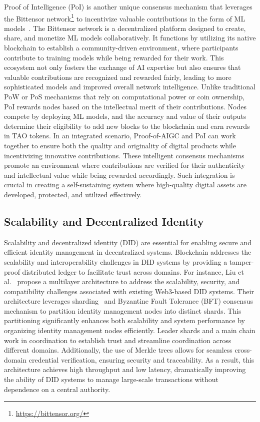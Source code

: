 \documentclass[5p,twocolumn]{elsarticle}
\begin{document}
Proof of Intelligence (PoI) is another unique consensus mechanism that leverages the Bittensor network\footnote{\url{https://bittensor.org/}} to incentivize valuable contributions in the form of ML models~\cite{rao2020bittensor}. The Bittensor network is a decentralized platform designed to create, share, and monetize ML models collaboratively. It functions by utilizing its native blockchain to establish a community-driven environment, where participants contribute to training models while being rewarded for their work. This ecosystem not only fosters the exchange of AI expertise but also ensures that valuable contributions are recognized and rewarded fairly, leading to more sophisticated models and improved overall network intelligence. Unlike traditional PoW or PoS mechanisms that rely on computational power or coin ownership, PoI rewards nodes based on the intellectual merit of their contributions. Nodes compete by deploying ML models, and the accuracy and value of their outputs determine their eligibility to add new blocks to the blockchain and earn rewards in TAO tokens. In an integrated scenario, Proof-of-AIGC and PoI can work together to ensure both the quality and originality of digital products while incentivizing innovative contributions. These intelligent consensus mechanisms promote an environment where contributions are verified for their authenticity and intellectual value while being rewarded accordingly. Such integration is crucial in creating a self-sustaining system where high-quality digital assets are developed, protected, and utilized effectively.


\subsection{Scalability and Decentralized Identity}
Scalability and decentralized identity (DID) are essential for enabling secure and efficient identity management in decentralized systems. Blockchain addresses the scalability and interoperability challenges in DID systems by providing a tamper-proof distributed ledger to facilitate trust across domains. For instance, Liu et al.~\cite{liu2024ssdid} propose a multilayer architecture to address the scalability, security, and compatibility challenges associated with existing Web3-based DID systems. Their architecture leverages sharding~\cite{thong2025know} and Byzantine Fault Tolerance (BFT) consensus mechanism to partition identity management nodes into distinct shards. This partitioning significantly enhances both scalability and system performance by organizing identity management nodes efficiently. Leader shards and a main chain work in coordination to establish trust and streamline coordination across different domains. Additionally, the use of Merkle trees allows for seamless cross-domain credential verification, ensuring security and traceability. As a result, this architecture achieves high throughput and low latency, dramatically improving the ability of DID systems to manage large-scale transactions without dependence on a central authority.
\end{document}
